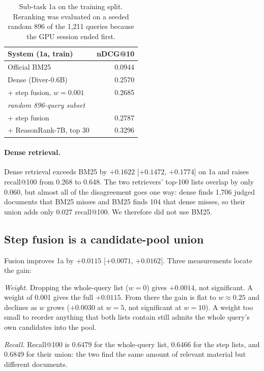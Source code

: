 \documentclass[11pt]{article}
\begin{document}
\begin{table}[t]
\centering\small
\begin{tabular}{lr}
\toprule
System (1a, train) & nDCG@10 \\
\midrule
Official BM25 & 0.0944 \\ %
Dense (Diver-0.6B) & 0.2570 \\ %
+ step fusion, $w{=}0.001$ & 0.2685 \\ %
\midrule
\multicolumn{2}{l}{\emph{random 896-query subset}} \\
+ step fusion & 0.2787 \\ %
+ ReasonRank-7B, top 30 & 0.3296 \\ %
\bottomrule
\end{tabular}
\caption{Sub-task 1a on the training split. Reranking was evaluated on a seeded random 896 of the
1,211 queries because the GPU session ended first.}
\label{tab:main}
\end{table}

\paragraph{Dense retrieval.} Dense retrieval exceeds BM25 by $+0.1622$ [$+0.1472$, $+0.1774$] on
1a and raises recall@100 from 0.268 to 0.648. The two retrievers' top-100 lists overlap by only
0.060, but almost all of the disagreement goes one way: dense finds 1,706 judged documents that
BM25 misses and BM25 finds 104 that dense misses, so their union adds only 0.027 recall@100.
We therefore did not use BM25.

\subsection{Step fusion is a candidate-pool union}
\label{sec:fusion}
Fusion improves 1a by $+0.0115$ [$+0.0071$, $+0.0162$]. Three measurements locate the gain:

\emph{Weight.} Dropping the whole-query list ($w{=}0$) gives $+0.0014$, not significant. A weight of
0.001 gives the full $+0.0115$. From there the gain is flat to $w{\approx}0.25$ and declines as
$w$ grows ($+0.0030$ at $w{=}5$, not significant at $w{=}10$). A weight too small to reorder
anything that both lists contain still admits the whole query's own candidates into the pool.

\emph{Recall.} Recall@100 is 0.6479 for the whole-query list, 0.6466 for the step lists, and
0.6849 for their union: the two find the same amount of relevant material but different
documents.
\end{document}
